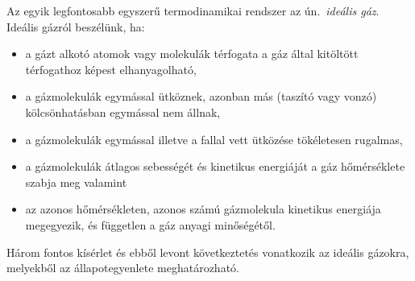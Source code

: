 Az egyik legfontosabb egyszerű termodinamikai rendszer az ún.~\emph{ideális gáz}. Ideális gázról beszélünk, ha:
\begin{itemize}
    \item a gázt alkotó atomok vagy molekulák térfogata a gáz által kitöltött térfogathoz képest elhanyagolható,
    \item a gázmolekulák egymással ütköznek, azonban más (taszító vagy vonzó) kölcsönhatásban egymással nem állnak,
    \item a gázmolekulák egymással illetve a fallal vett ütközése tökéletesen rugalmas,
    \item a gázmolekulák átlagos sebességét és kinetikus energiáját a gáz hőmérséklete szabja meg valamint
    \item az azonos hőmérsékleten, azonos számú gázmolekula kinetikus energiája megegyezik, és független a gáz anyagi minőségétől.
\end{itemize}
Három fontos kísérlet és ebből levont következtetés vonatkozik az ideális gázokra, melyekből az állapotegyenlete meghatározható.
